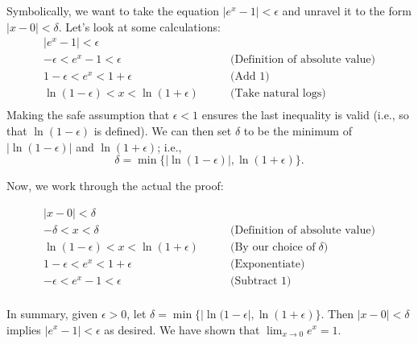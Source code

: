 {Symbolically, we want to take the equation $|e^x - 1| < \epsilon$ and unravel it to the form $|x-0| < \delta$.  Let's look at some calculations:
\begin{eqnarray*}
|e^x - 1| < \epsilon&\\
-\epsilon < e^x - 1 < \epsilon& \qquad \textrm{(Definition of absolute value)}\\
1-\epsilon < e^x < 1+\epsilon & \qquad \textrm{(Add 1)}\\
\ln(1-\epsilon) < x < \ln(1+\epsilon) & \qquad \textrm{(Take natural logs)}\\
\end{eqnarray*}
Making the safe assumption that $\epsilon<1$ ensures the last inequality is valid (i.e., so that $\ln (1-\epsilon)$ is defined). We can then set $\delta$ to be the minimum of $|\ln(1-\epsilon)|$ and $\ln(1+\epsilon)$; i.e.,  %
$$\delta = \min\{|\ln(1-\epsilon)|, \ln(1+\epsilon)\}.$$  

Now, we work through the actual the proof:


\begin{eqnarray*}
|x - 0|<\delta\\
-\delta < x < \delta& \qquad \textrm{(Definition of absolute value)}\\
\ln(1-\epsilon) < x < \ln(1+\epsilon) & \qquad \textrm{(By our choice of}\; \delta)\\
1-\epsilon < e^x < 1+\epsilon & \qquad \textrm{(Exponentiate)}\\
-\epsilon < e^x - 1 < \epsilon & \qquad \textrm{(Subtract 1)}\\
\end{eqnarray*}

In summary, given $\epsilon > 0$, let $\delta = \min\{|\ln(1-\epsilon |, \ln(1+\epsilon)\}$. Then $|x - 0| < \delta$ implies $|e^x - 1|< \epsilon$ as desired.  We have shown that $\displaystyle \lim_{x\rightarrow 0} e^x = 1 $.
}\\

